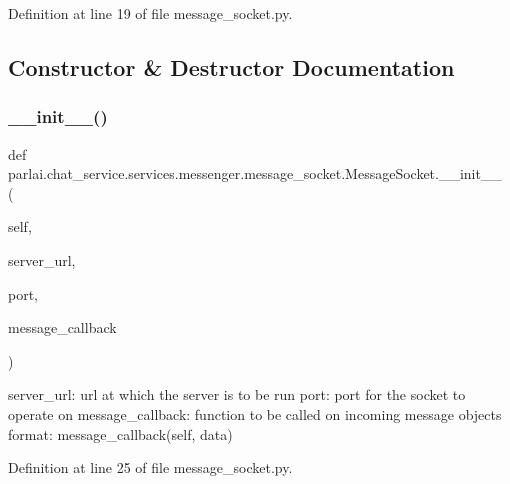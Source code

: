 Definition at line 19 of file message\+\_\+socket.\+py.



\subsection{Constructor \& Destructor Documentation}
\mbox{\label{classparlai_1_1chat__service_1_1services_1_1messenger_1_1message__socket_1_1MessageSocket_a1bf9d1059a684a1e0a7dde6fa869ac53}} 
\subsubsection{\texorpdfstring{\+\_\+\+\_\+init\+\_\+\+\_\+()}{\_\_init\_\_()}}
{\footnotesize\ttfamily def parlai.\+chat\+\_\+service.\+services.\+messenger.\+message\+\_\+socket.\+Message\+Socket.\+\_\+\+\_\+init\+\_\+\+\_\+ (\begin{DoxyParamCaption}\item[{}]{self,  }\item[{}]{server\+\_\+url,  }\item[{}]{port,  }\item[{}]{message\+\_\+callback }\end{DoxyParamCaption})}

\begin{DoxyVerb}server_url:           url at which the server is to be run
port:                 port for the socket to operate on
message_callback:     function to be called on incoming message objects
              format: message_callback(self, data)
\end{DoxyVerb}
 

Definition at line 25 of file message\+\_\+socket.\+py.


